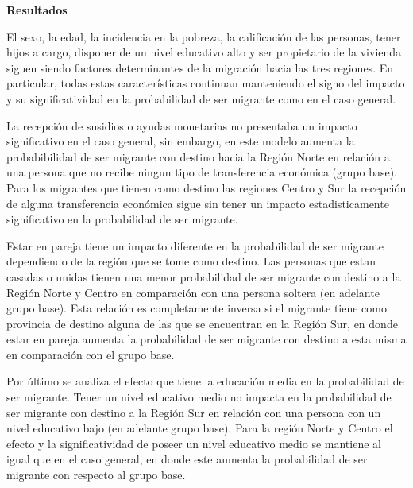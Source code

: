 \documentclass[12pt,a4paper]{article}
\begin{document}
\textbf{Resultados}

El sexo, la edad, la incidencia en la pobreza, la calificación de las personas, tener hijos a cargo, disponer de un nivel educativo alto y ser propietario de la vivienda siguen siendo factores determinantes de la migración hacia las tres regiones. En particular, todas estas características continuan  manteniendo el signo del impacto y su significatividad en la probabilidad de ser migrante como en el caso general. 

La recepción de susidios o ayudas monetarias no presentaba un impacto significativo en el caso general, sin embargo, en este modelo aumenta la probabibilidad de ser migrante con destino hacia la Región Norte en relación a una persona que no recibe ningun tipo de transferencia económica (grupo base). Para los migrantes que tienen como destino las regiones Centro y Sur la recepción de alguna transferencia económica  sigue sin tener un impacto estadisticamente significativo en la probabilidad de ser migrante.

Estar en pareja tiene un impacto diferente en la probabilidad de ser migrante dependiendo de la región que se tome como destino. Las personas que estan casadas o unidas tienen una menor probabilidad de ser migrante con destino a la Región Norte y Centro en comparación con una persona soltera (en adelante grupo base). Esta relación es completamente inversa si el migrante tiene como provincia de destino alguna de las que se encuentran en la Región Sur, en donde estar en pareja aumenta la probabilidad de ser migrante con destino a esta misma en comparación con el grupo base.


Por último se analiza el efecto que tiene la educación media en la probabilidad de ser migrante. Tener un nivel educativo medio no impacta en la probabilidad de ser migrante con destino a la Región Sur en relación con una persona con un nivel educativo bajo (en adelante grupo base). Para la región Norte y Centro el efecto y la significatividad de poseer un nivel educativo medio se mantiene al igual que en el caso general, en donde este aumenta la probabilidad de ser migrante con respecto al grupo base.
\end{document}
